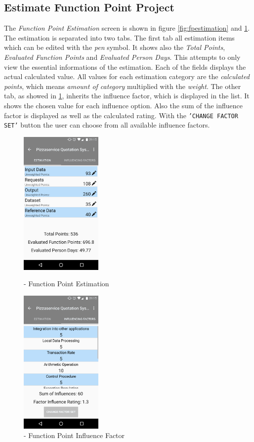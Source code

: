 \subsection{Estimate Function Point Project}

The \textit{Function Point Estimation} screen is shown in figure \ref{fig:fpestimation} and \ref{fig:fpestimation2}. The estimation is separated into two tabs. The first tab all estimation items which can be edited with the \textit{pen} symbol. It shows also the \textit{Total Points}, \textit{Evaluated Function Points} and \textit{Evaluated Person Days}. This attempts to only view the essential informations of the estimation. Each of the fields displays the actual calculated value. All values for each estimation category are the \textit{calculated points}, which means \textit{amount of category} multiplied with the \textit{weight}. The other tab, as showed in \ref{fig:fpestimation2}, inherits the influence factor, which is displayed in the list. It shows the chosen value for each influence option. Also the sum of the influence factor is displayed as well as the calculated rating. With the \texttt{'CHANGE FACTOR SET'} button the user can choose from all available influence factors. 
\begin{figure}[htb]
	\centering
	\begin{minipage}[t]{0.45\linewidth}
		\centering 
		\includegraphics[width=4cm]{images/FPEstimation.png} 
		\caption{- Function Point Estimation} 
		\label{fig:fpestimation}
	\end{minipage}%
	\hfill
	\begin{minipage}[t]{0.45\linewidth}
		\centering 
		\includegraphics[width=4cm]{images/FPInfluence.png} 
		\caption{- Function Point Influence Factor} 
		\label{fig:fpestimation2}
	\end{minipage}
\end{figure}


